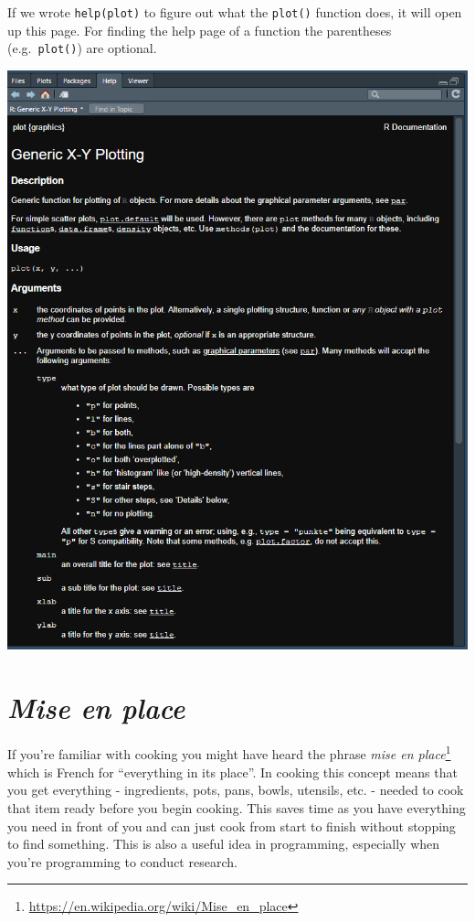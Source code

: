 \documentclass[
]{krantz}
\renewcommand{\href}[2]{#2\footnote{\url{#1}}}
\begin{document}
If we wrote \texttt{help(plot)} to figure out what the \texttt{plot()} function does, it will open up this page. For finding the help page of a function the parentheses (e.g.~\texttt{plot()}) are optional.

\includegraphics{images/help_page.PNG}

\hypertarget{mise-en-place}{%
\chapter{\texorpdfstring{\emph{Mise en place}}{Mise en place}}\label{mise-en-place}}

If you're familiar with cooking you might have heard the phrase \href{https://en.wikipedia.org/wiki/Mise_en_place}{\emph{mise en place}} which is French for ``everything in its place''. In cooking this concept means that you get everything - ingredients, pots, pans, bowls, utensils, etc. - needed to cook that item ready before you begin cooking. This saves time as you have everything you need in front of you and can just cook from start to finish without stopping to find something. This is also a useful idea in programming, especially when you're programming to conduct research.
\end{document}
